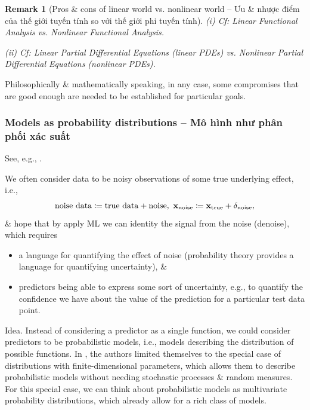\documentclass{article}
\newtheorem{remark}{Remark}
\begin{document}
\begin{remark}[Pros \& cons of linear world vs. nonlinear world -- Ưu \& nhược điểm của thế giới tuyến tính so với thế giới phi tuyến tính]
	\item(i) Cf: Linear Functional Analysis vs. Nonlinear Functional Analysis.
	\item(ii) Cf: Linear Partial Differential Equations (linear PDEs) vs. Nonlinear Partial Differential Equations (nonlinear PDEs).
\end{remark}
Philosophically \& mathematically speaking, in any case, some compromises that are good enough are needed to be established for particular goals.

\subsubsection{Models as probability distributions -- Mô hình như phân phối xác suất}
See, e.g., \cite[Chap. 8, Sect. 8.1.3: Models as Probability Distributions]{Deisenroth_Faisal_Ong2024}.

We often consider data to be noisy observations of some true underlying effect, i.e.,
\begin{equation*}
	\mbox{noise data}\coloneqq\mbox{true data} + \mbox{noise},\ {\bf x}_{\rm noise}\coloneqq{\bf x}_{\rm true} + \delta_{\rm noise},
\end{equation*}
\& hope that by apply ML we can identity the signal from the noise (denoise), which requires
\begin{itemize}
	\item a language for quantifying the effect of noise (probability theory provides a language for quantifying uncertainty), \&
	\item predictors being able to express some sort of uncertainty, e.g., to quantify the confidence we have about the value of the prediction for a particular test data point.
\end{itemize}
{\sf Idea.} Instead of considering a predictor as a single function, we could consider predictors to be probabilistic models, i.e., models describing the distribution of possible functions. In \cite{Deisenroth_Faisal_Ong2024}, the authors limited themselves to the special case of distributions with finite-dimensional parameters, which allows them to describe probabilistic models without needing stochastic processes \& random measures. For this special case, we can think about probabilistic models as multivariate probability distributions, which already allow for a rich class of models.
\end{document}
